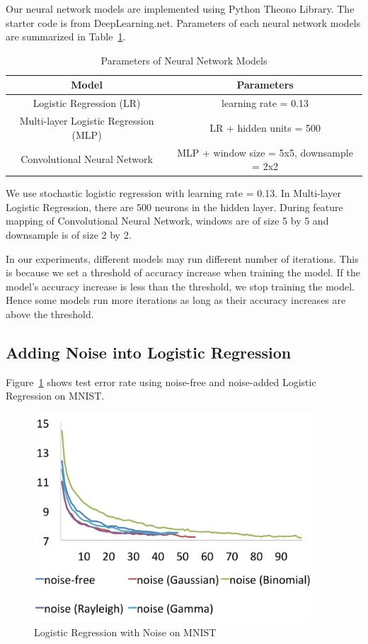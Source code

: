 Our neural network models are implemented using Python Theono Library. The
starter code is from DeepLearning.net. Parameters of each neural
network models are summarized in Table~\ref{params}.
\vspace{-7pt}
\begin{table}[!htbp]
\centering
\begin{tabular}{| c | c |}
\hline
Model & Parameters \\
\hline
Logistic Regression (LR) & learning rate = 0.13 \\
Multi-layer Logistic Regression (MLP) & LR + hidden units = 500 \\
Convolutional Neural Network & MLP + window size = 5x5, downsample = 2x2\\
\hline
\end{tabular}
\caption{Parameters of Neural Network Models}
\label{params}
\end{table}

We use stochastic logistic regression with learning rate = 0.13.
In Multi-layer Logistic Regression, there are 500 neurons in the hidden
layer. During feature mapping of Convolutional Neural Network, windows
are of size 5 by 5 and downsample is of size 2 by 2.

In our experiments, different models may run different number of
iterations. This is because we set a threshold of accuracy increase when
training the model. If the model's accuracy increase is less than the
threshold, we stop training the model. Hence some models run more
iterations as long as their accuracy increases are above the threshold.

\subsection{Adding Noise into Logistic Regression}
Figure~\ref{logistic} shows test error rate using noise-free and
noise-added Logistic Regression on MNIST.
\begin{figure}[!htbp]
\centering
\includegraphics[width=295pt]{f-figs/logistic.png}
\caption{Logistic Regression with Noise on MNIST}
\label{logistic}
\end{figure}

